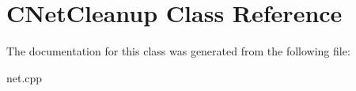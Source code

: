\hypertarget{class_c_net_cleanup}{}\section{C\+Net\+Cleanup Class Reference}
\label{class_c_net_cleanup}


The documentation for this class was generated from the following file\+:\begin{DoxyCompactItemize}
\item 
net.\+cpp\end{DoxyCompactItemize}
